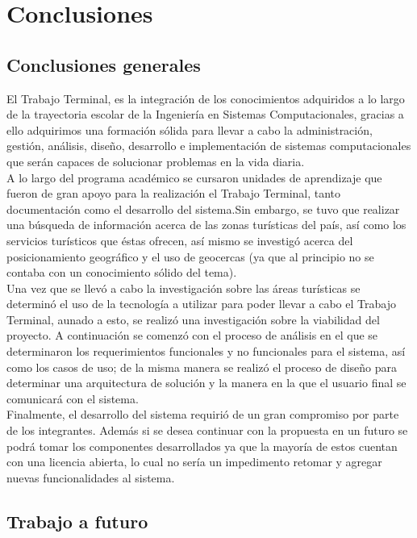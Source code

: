 \chapter{Conclusiones}

\section{Conclusiones generales}

El Trabajo Terminal, es la integración de los conocimientos adquiridos a lo largo de la trayectoria escolar de la Ingeniería en Sistemas Computacionales, gracias a ello adquirimos 
una formación sólida para llevar a cabo la administración, gestión, análisis, diseño, desarrollo e implementación de sistemas computacionales que serán capaces de solucionar problemas en la vida diaria.\\

A lo largo del programa académico se cursaron unidades de aprendizaje que fueron de gran apoyo para la realización el Trabajo Terminal, tanto documentación como el desarrollo del sistema.Sin embargo, se tuvo que realizar una búsqueda de información acerca de las zonas turísticas del país, así como los servicios turísticos que éstas ofrecen, así mismo se investigó acerca del posicionamiento geográfico y el uso de geocercas (ya que al principio no se contaba con un conocimiento sólido del tema). \\

Una vez que se llevó a cabo la investigación sobre las áreas turísticas se determinó el uso de la tecnología a utilizar para poder llevar a cabo el Trabajo Terminal, aunado a esto, se realizó una investigación sobre la viabilidad del proyecto. A continuación se comenzó con el proceso de análisis en el que se determinaron los requerimientos funcionales y no funcionales para el sistema, así como los casos de uso; de la misma manera se realizó el proceso de diseño para determinar una arquitectura de solución y la manera en la que el usuario final se comunicará con el sistema.\\

Finalmente, el desarrollo del sistema requirió de un gran compromiso por parte de los integrantes. Además si se desea continuar con la propuesta en un futuro se podrá tomar los componentes desarrollados ya que la mayoría de estos cuentan con una licencia abierta, lo cual no sería un impedimento retomar y agregar nuevas funcionalidades al sistema.


\section{Trabajo a futuro}

